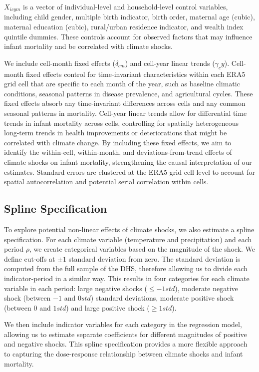 \documentclass[a4paper]{article}
\begin{document}
\(X_{icym}\) is a vector of individual-level and household-level control variables, including child gender, multiple birth indicator, birth order, maternal age (cubic), maternal education (cubic), rural/urban residence indicator, and wealth index quintile dummies. These controls account for observed factors that may influence infant mortality and be correlated with climate shocks.

We include cell-month fixed effects (\(\delta_{cm}\)) and cell-year linear trends (\(\gamma_{c}y\)).  Cell-month fixed effects control for time-invariant characteristics within each ERA5 grid cell that are specific to each month of the year, such as baseline climatic conditions, seasonal patterns in disease prevalence, and agricultural cycles.  These fixed effects absorb any time-invariant differences across cells and any common seasonal patterns in mortality.  Cell-year linear trends allow for differential time trends in infant mortality across cells, controlling for spatially heterogeneous long-term trends in health improvements or deteriorations that might be correlated with climate change.  By including these fixed effects, we aim to identify the within-cell, within-month, and deviations-from-trend effects of climate shocks on infant mortality, strengthening the causal interpretation of our estimates. Standard errors are clustered at the ERA5 grid cell level to account for spatial autocorrelation and potential serial correlation within cells.


\subsection{Spline Specification}

To explore potential non-linear effects of climate shocks, we also estimate a spline specification.  For each climate variable (temperature and precipitation) and each period \(\rho\), we create categorical variables based on the magnitude of the shock. We define cut-offs at \(\pm 1\) standard deviation from zero. The standard deviation is computed from the full sample of the DHS, therefore allowing us to divide each indicator-period in a similar way. This results in four categories for each climate variable in each period: large negative shocks (\(\leq -1 std\)), moderate negative shock (between \(-1\) and \(0std\)) standard deviations, moderate positive shock (between \(0\) and \(1std\)) and large positive shock (\(\geq 1std \)). 

We then include indicator variables for each category in the regression model, allowing us to estimate separate coefficients for different magnitudes of positive and negative shocks.  This spline specification provides a more flexible approach to capturing the dose-response relationship between climate shocks and infant mortality.
\end{document}
